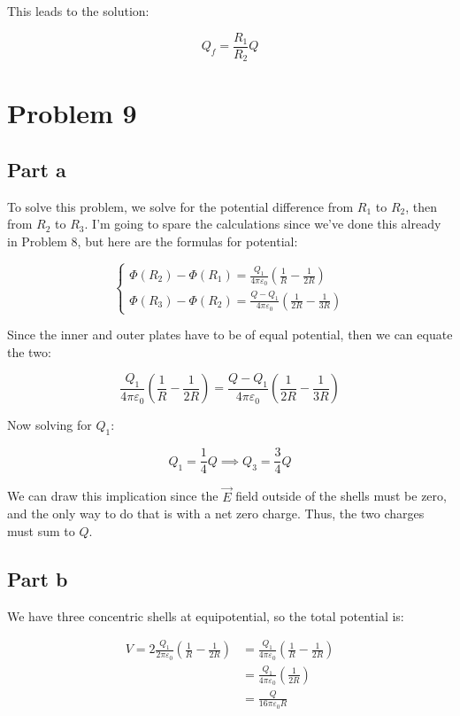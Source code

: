 \documentclass{article}
\theoremstyle{definition}
\numberwithin{equation}{section}
\numberwithin{definition}{section}
\begin{document}
    This leads to the solution:

    \[ Q_f = \frac{R_1}{R_2} Q\]

    \section{Problem 9}

    \subsection{Part a}

    To solve this problem, we solve for the potential difference from $R_1$ to $R_2$, then from $R_2$ to $R_3$. I'm going to spare the calculations since we've done this already in Problem 8, but here are the formulas for potential: 


    \[ \begin{cases}
        \Phi (R_2) - \Phi(R_1) = \frac{Q_1}{4\pi \varepsilon_0} \left(\frac{1}{R} - \frac{1}{2R}\right)\\
        \Phi(R_3) - \Phi(R_2) = \frac{Q - Q_1}{4\pi\varepsilon_0}\left(\frac{1}{2R} - \frac{1}{3R}\right)
    \end{cases}\]

    Since the inner and outer plates have to be of equal potential, then we can equate the two: 

    \[\frac{Q_1}{4\pi \varepsilon_0} \left(\frac{1}{R} - \frac{1}{2R}\right) = \frac{Q - Q_1}{4\pi\varepsilon_0}\left(\frac{1}{2R} - \frac{1}{3R}\right)\]

    Now solving for $Q_1$:

    \[ Q_1 = \frac{1}{4} Q \implies Q_3 = \frac{3}{4} Q\]

    We can draw this implication since the $\vec{E}$ field outside of the shells must be zero, and the only way to do that is with a net zero charge. Thus, the two charges must sum to $Q$.
    

    \subsection{Part b}

    We have three concentric shells at equipotential, so the total potential is: 

    \begin{align*} 
        V = 2\frac{Q_1}{2\pi \varepsilon_0} \left(\frac{1}{R} - \frac{1}{2R}\right) &= \frac{Q_1}{4\pi \varepsilon_0}\left(\frac{1}{R} - \frac{1}{2R}\right)\\
        &= \frac{Q_1}{4\pi \varepsilon_0} \left(\frac{1}{2R}\right)\\
        &= \frac{Q}{16\pi \varepsilon_0 R}
    \end{align*}
\end{document}
